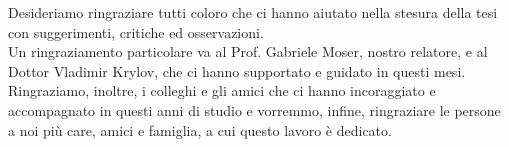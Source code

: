 
\italiano
\ringraziamenti

Desideriamo ringraziare tutti coloro che ci hanno aiutato nella stesura della tesi con suggerimenti, critiche ed osservazioni.\\
Un ringraziamento particolare va al Prof. Gabriele Moser, nostro relatore, e al Dottor Vladimir Krylov, che ci hanno supportato e guidato in questi mesi. \\
Ringraziamo, inoltre, i colleghi e gli amici che ci hanno incoraggiato e accompagnato in questi anni di studio e vorremmo, infine, ringraziare le persone a noi più care, amici e famiglia, a cui questo lavoro è dedicato.